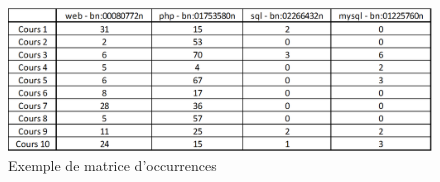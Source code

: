 \begin{figure}[ht]
\centering
\centerline{  %
\includegraphics[scale=0.85]{3-Methode-CREA/images/1-pre-traitement-semantique/exemple_matrice_occurrences.png}
}
\caption{Exemple de matrice d'occurrences}
\label{figure:3-I-5-MatriceOccurrences}
\end{figure}





\clearpage %
\newpage   %


